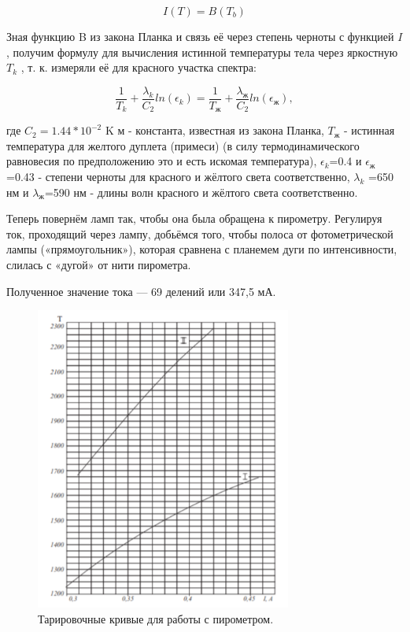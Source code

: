 \documentclass[a4paper]{article}
\begin{document}
$$I(T)=B(T_b) $$


Зная функцию B из закона Планка и связь её через степень черноты с функцией $I$, получим формулу для вычисления истинной температуры тела через яркостную $T_k$ , т. к. измеряли её для красного участка спектра: \par

\begin{equation}
        \label{1}
\frac{1}{T_k} + \frac{\lambda_k}{C_2} ln(\epsilon_k) = \frac{1}{T_\text{ж}} + \frac{\lambda_\text{ж}}{C_2} ln(\epsilon_\text{ж}),
\end{equation}


где $C_2 = 1.44*10^{-2}$ K м - константа, известная из закона Планка, $T_\text{ж}$ - истинная температура для желтого дуплета (примеси) (в силу термодинамического равновесия по предположению это и есть искомая температура), $\epsilon_k$=0.4 и $\epsilon_\text{ж}$=0.43 - степени черноты для красного и жёлтого света соответственно,  $\lambda_k$ =650 нм и $\lambda_\text{ж}$=590 нм - длины волн красного и жёлтого света соответственно. \par

Теперь повернём ламп так, чтобы она была обращена к пирометру. Регулируя ток, проходящий через лампу, добьёмся того, чтобы полоса от фотометрической лампы («прямоугольник»), которая сравнена с планемем дуги по интенсивности, слилась с «дугой» от нити пирометра. \par

Полученное значение тока — 69 делений или 347,5 мА.


\begin {figure}[H]
\begin{center}
\par
\includegraphics[width=0.75\textwidth]{crivie.png}
\caption{Тарировочные кривые для работы с пирометром.}
\end{center}
\end {figure}
\end{document}
